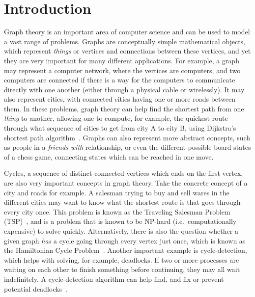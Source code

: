\chapter{Introduction}
\label{cha:intro}
Graph theory is an important area of computer science and can be used to model a vast range of problems. Graphs are conceptually simple mathematical objects, which represent \textit{things} or vertices and connections between these vertices, and yet they are very important for many different applications. For example, a graph may represent a computer network, where the vertices are computers, and two computers are connected if there is a way for the computers to communicate directly with one another (either through a physical cable or wirelessly). It may also represent cities, with connected cities having one or more roads between them. In these problems, graph theory can help find the shortest path from one \textit{thing} to another, allowing one to compute, for example, the quickest route through what sequence of cities to get from city A to city B, using Dijkstra's shortest path algorithm~\cite{article:dijkstra}. Graphs can also represent more abstract concepts, such as people in a \textit{friends-with}-relationship, or even the different possible board states of a chess game, connecting states which can be reached in one move.

Cycles, a sequence of distinct connected vertices which ends on the first vertex, are also very important concepts in graph theory. Take the concrete concept of a city and roads for example. A salesman trying to buy and sell wares in the different cities may want to know what the shortest route is that goes through every city once. This problem is known as the Traveling Salesman Problem (TSP)~\cite{article:TSP}, and is a problem that is known to be NP-hard (i.e.\ computationally expensive) to solve quickly. Alternatively, there is also the question whether a given graph \textit{has} a cycle going through every vertex just once, which is known as the Hamiltonian Cycle Problem~\cite{article:longest-cycle-np}. Another important example is cycle-detection, which helps with solving, for example, deadlocks. If two or more processes are waiting on each other to finish something before continuing, they may all wait indefinitely. A cycle-detection algorithm can help find, and fix or prevent potential deadlocks~\cite{article:deadlocks}.

